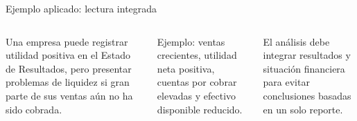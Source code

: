 \begin{frame}{Ejemplo aplicado: lectura integrada}
  \begin{columns}[T,onlytextwidth]
    \footnotesize
    Una empresa puede registrar utilidad positiva en el Estado de Resultados, pero presentar problemas de liquidez si gran parte de sus ventas aún no ha sido cobrada.

    \vspace{0.5em}
    Ejemplo: ventas crecientes, utilidad neta positiva, cuentas por cobrar elevadas y efectivo disponible reducido.

    \vspace{0.5em}
    El análisis debe integrar resultados y situación financiera para evitar conclusiones basadas en un solo reporte.
    \flujoERPdashboard
  \end{columns}
\end{frame}
